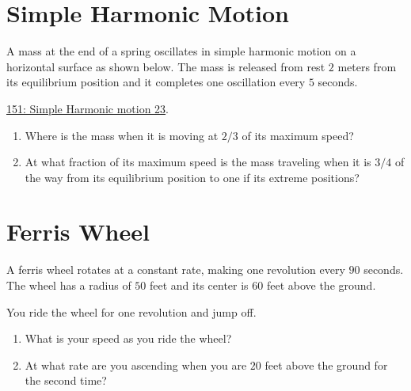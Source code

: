 \documentclass{ximera}
\begin{document}
\section{Simple Harmonic Motion}

\begin{question} \label{QODFIER33r3r}
A mass at the end of a spring oscillates in simple harmonic motion on a horizontal surface as shown below. The mass is released from rest $2$ meters from its equilibrium position and it completes one oscillation every $5$ seconds.

\href{https://www.desmos.com/calculator/noxooak1au}{151: Simple Harmonic motion 23}.

 
\begin{onlineOnly}
    \begin{center}
\end{center}
\end{onlineOnly}


\begin{enumerate}
\item Where is the mass when it is moving at $2/3$ of its maximum speed? 

\item At what fraction of its maximum speed is the mass traveling when it is $3/4$ of the way from its equilibrium position to one if its extreme positions?
\end{enumerate}

\end{question}

\section{Ferris Wheel}
\begin{question}  \label{QOERERERERQ}
A ferris wheel rotates at a constant rate, making one revolution every $90$ seconds. The wheel has a radius of $50$ feet and its center is $60$ feet above the ground.

You ride the wheel for one revolution and jump off.

\begin{enumerate}
\item What is your speed as you ride the wheel?

\item At what rate are you ascending when you are $20$ feet above the ground for the second time?
\end{enumerate}
\end{question}
\end{document}

